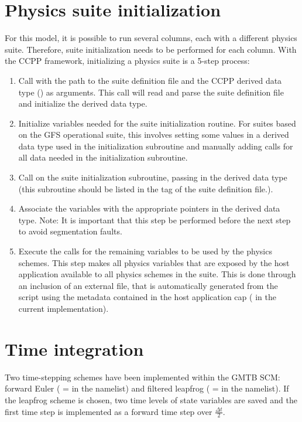 \section{Physics suite initialization}
For this model, it is possible to run several columns, each with a different physics suite. Therefore, suite initialization needs to be performed for each column. With the CCPP framework, initializing a physics suite is a 5-step process:
\begin{enumerate}
\item Call  with the path to the suite definition file and the CCPP derived data type () as arguments. This call will read and parse the suite definition file and initialize the  derived data type.
\item Initialize variables needed for the suite initialization routine. For suites based on the GFS operational suite, this involves setting some values in a derived data type used in the initialization subroutine and manually adding  calls for all data needed in the initialization subroutine.
\item Call  on the suite initialization subroutine, passing in the  derived data type (this subroutine should be listed in the  tag of the suite definition file.).
\item Associate the  variables with the appropriate pointers in the  derived data type. Note: It is important that this step be performed before the next step to avoid segmentation faults.
\item Execute the  calls for the remaining variables to be used by the physics schemes. This step makes all physics variables that are exposed by the host application available to all physics schemes in the suite. This is done through an inclusion of an external file,  that is automatically generated from the  script using the metadata contained in the host application cap ( in the current implementation).
\end{enumerate}

\section{Time integration}
Two time-stepping schemes have been implemented within the GMTB SCM: forward Euler ( =  in the  namelist) and filtered leapfrog ( =  in the  namelist). If the leapfrog scheme is chosen, two time levels of state variables are saved and the first time step is implemented as a forward time step over $\frac{\Delta t}{2}$.

